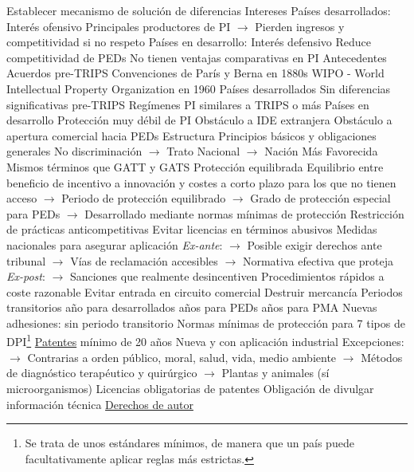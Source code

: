 \documentclass{nuevotema}
\begin{document}
\begin{esquemal}
				\4 Establecer mecanismo de solución de diferencias
			\3 Intereses
				\4 Países desarrollados:
				\4[] Interés ofensivo
				\4[] Principales productores de PI
				\4[] $\to$ Pierden ingresos y competitividad si no respeto
				\4 Países en desarrollo:
				\4[] Interés defensivo
				\4[] Reduce competitividad de PEDs
				\4[] No tienen ventajas comparativas en PI
		\2 Antecedentes
			\3 Acuerdos pre-TRIPS
				\4 Convenciones de París y Berna en 1880s
				\4 WIPO - World Intellectual Property Organization en 1960
			\3 Países desarrollados
				\4 Sin diferencias significativas pre-TRIPS
				\4 Regímenes PI similares a TRIPS o más
			\3 Países en desarrollo
				\4 Protección muy débil de PI
				\4 Obstáculo a IDE extranjera
				\4 Obstáculo a apertura comercial hacia PEDs
		\2 Estructura
			\3 Principios básicos y obligaciones generales
				\4 No discriminación
				\4[] $\to$ Trato Nacional
				\4[] $\to$ Nación Más Favorecida
				\4[] Mismos términos que GATT y GATS
				\4 Protección equilibrada
				\4[] Equilibrio entre beneficio de incentivo a innovación
				\4[] y costes a corto plazo para los que no tienen acceso
				\4[] $\to$ Periodo de protección equilibrado
				\4[] $\to$ Grado de protección especial para PEDs
				\4[] $\to$ Desarrollado mediante normas mínimas de protección
				\4 Restricción de prácticas anticompetitivas
				\4[] Evitar licencias en términos abusivos
				\4 Medidas nacionales para asegurar aplicación
				\4[] \textit{Ex-ante}:
				\4[] $\to$ Posible exigir derechos ante tribunal
				\4[] $\to$ Vías de reclamación accesibles
				\4[] $\to$ Normativa efectiva que proteja
				\4[] \textit{Ex-post}:
				\4[] $\to$ Sanciones que realmente desincentiven
				\4[] Procedimientos rápidos a coste razonable
				\4[] Evitar entrada en circuito comercial
				\4[] Destruir mercancía
				\4 Periodos transitorios
				 año para desarrollados
				 años para PEDs
				 años para PMA
				\4[] Nuevas adhesiones: sin periodo transitorio
			\3 Normas mínimas de protección para 7 tipos de DPI\footnote{Se trata de unos estándares mínimos, de manera que un país puede facultativamente aplicar reglas más estrictas.}
				\4 \underline{Patentes}
				\4[] mínimo de 20 años
				\4[] Nueva y con aplicación industrial
				\4[] Excepciones:
				\4[] $\to$ Contrarias a orden público, moral, salud, vida, medio ambiente
				\4[] $\to$ Métodos de diagnóstico terapéutico y quirúrgico
				\4[] $\to$ Plantas y animales (sí microorganismos)
				\4[] Licencias obligatorias de patentes
				\4[] Obligación de divulgar información técnica
				\4 \underline{Derechos de autor}

\end{esquemal}
\end{document}

